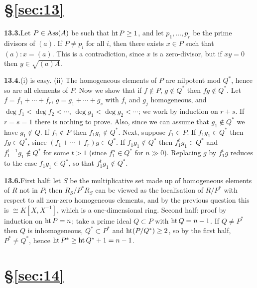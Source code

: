 
\section*{\S\ref{sec:13}}

\noindent\textbf{13.3.}\quad Let $P \in \operatorname{Ass}(A)$ be such that $\operatorname{ht} P \ge 1$, and let $p_1, \ldots, p_r$ be the prime
divisors of $(a)$. If $P \neq p_i$ for all $i$, then there exists $x \in P$ such that $(a):x = (a)$.
This is a contradiction, since $x$ is a zero-divisor, but if $xy = 0$ then $y \in \sqrt{(a)A}$.

\noindent\textbf{13.4.}\quad (i) is easy. (ii) The homogeneous elements of $P$ are nilpotent mod $Q^*$,
hence so are all elements of $P$. Now we show that if $f \notin P$, $g \notin Q^*$ then
$fg \notin Q^*$. Let $f = f_1 + \cdots + f_r$, $g = g_1 + \cdots + g_s$ with $f_i$ and $g_j$ homogeneous,
and $\deg f_1 < \deg f_2 < \cdots$, $\deg g_1 < \deg g_2 < \cdots$; we work by induction on
$r + s$. If $r = s = 1$ there is nothing to prove. Also, since we can assume that
$g_1 \notin Q^*$ we have $g_1 \notin Q$. If $f_1 \notin P$ then $f_1g_1 \notin Q^*$. Next, suppose $f_1 \in P$. If
$f_1g_1 \in Q^*$ then $fg \in Q^*$, since $(f_1 + \cdots + f_r)g \in Q^*$. If $f_1g_1 \notin Q^*$ then
$f_1^tg_1 \in Q^*$ and $f_1^{t-1}g_1 \notin Q^*$ for some $t > 1$ (since $f_1^n \in Q^*$ for $n \gg 0$).
Replacing $g$ by $f_1^tg$ reduces to the case $f_1g_1 \in Q^*$, so that $f_1^tg_1 \notin Q^*$.

\noindent\textbf{13.6.}\quad First half: let $S$ be the multiplicative set made up of homogeneous elements
of $R$ not in $P$; then $R_S/P^*R_S$ can be viewed as the localisation of $R/P^*$ with
respect to all non-zero homogeneous elements, and by the previous question
this is $\cong K[X, X^{-1}]$, which is a one-dimensional ring. Second half: proof by
induction on $\operatorname{ht} P = n$; take a prime ideal $Q \subset P$ with $\operatorname{ht} Q = n - 1$. If $Q \neq P^*$
then $Q$ is inhomogeneous, $Q^* \subset P^*$ and $\operatorname{ht}(P/Q^*) \ge 2$, so by the first half,
$P^* \neq Q^*$, hence $\operatorname{ht} P^* \ge \operatorname{ht} Q^* + 1 = n - 1$.

\section*{\S\ref{sec:14}}

